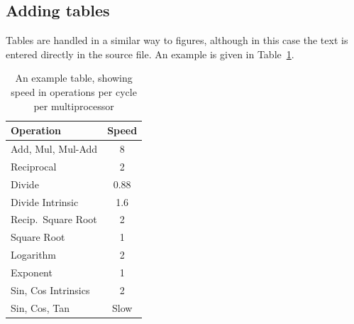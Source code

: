 \subsection{Adding tables}
Tables are handled in a similar way to figures, although in this case the text
is entered directly in the source file.
An example is given in Table~\ref{tab:sample}.

\begin{table}[tp]
   \begin{minipage}{\textwidth}
      \begin{center}
         \begin{tabular}{l|c}
            Operation           & Speed \\
            \hline
            Add, Mul, Mul-Add   & 8     \\
            Reciprocal          & 2     \\
            Divide              & 0.88  \\
            Divide Intrinsic    & 1.6   \\
            \hline
            Recip.\ Square Root & 2     \\
            Square Root         & 1     \\
            \hline
            Logarithm           & 2     \\
            Exponent            & 1     \\
            \hline
            Sin, Cos Intrinsics & 2     \\
            Sin, Cos, Tan       & Slow  \\
         \end{tabular}
      \end{center}
   \end{minipage}
   \caption{An example table, showing speed in operations per cycle per
      multiprocessor}
   \label{tab:sample}
\end{table}

